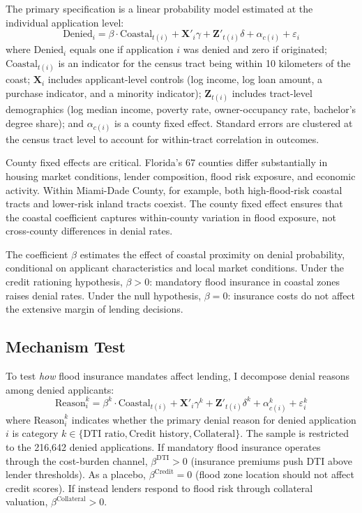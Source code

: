 \documentclass[12pt]{article}
\begin{document}
The primary specification is a linear probability model estimated at the individual application level:
\begin{equation}
\text{Denied}_{i} = \beta \cdot \text{Coastal}_{t(i)} + \mathbf{X}'_{i}\gamma + \mathbf{Z}'_{t(i)}\delta + \alpha_{c(i)} + \varepsilon_{i}
\label{eq:main}
\end{equation}
where $\text{Denied}_{i}$ equals one if application $i$ was denied and zero if originated; $\text{Coastal}_{t(i)}$ is an indicator for the census tract being within 10 kilometers of the coast; $\mathbf{X}_{i}$ includes applicant-level controls (log income, log loan amount, a purchase indicator, and a minority indicator); $\mathbf{Z}_{t(i)}$ includes tract-level demographics (log median income, poverty rate, owner-occupancy rate, bachelor's degree share); and $\alpha_{c(i)}$ is a county fixed effect. Standard errors are clustered at the census tract level to account for within-tract correlation in outcomes.

County fixed effects are critical. Florida's 67 counties differ substantially in housing market conditions, lender composition, flood risk exposure, and economic activity. Within Miami-Dade County, for example, both high-flood-risk coastal tracts and lower-risk inland tracts coexist. The county fixed effect ensures that the coastal coefficient captures within-county variation in flood exposure, not cross-county differences in denial rates.

The coefficient $\beta$ estimates the effect of coastal proximity on denial probability, conditional on applicant characteristics and local market conditions. Under the credit rationing hypothesis, $\beta > 0$: mandatory flood insurance in coastal zones raises denial rates. Under the null hypothesis, $\beta = 0$: insurance costs do not affect the extensive margin of lending decisions.

\subsection{Mechanism Test}

To test \textit{how} flood insurance mandates affect lending, I decompose denial reasons among denied applicants:
\begin{equation}
\text{Reason}^{k}_{i} = \beta^{k} \cdot \text{Coastal}_{t(i)} + \mathbf{X}'_{i}\gamma^{k} + \mathbf{Z}'_{t(i)}\delta^{k} + \alpha^{k}_{c(i)} + \varepsilon^{k}_{i}
\label{eq:mechanism}
\end{equation}
where $\text{Reason}^{k}_{i}$ indicates whether the primary denial reason for denied application $i$ is category $k \in \{\text{DTI ratio}, \text{Credit history}, \text{Collateral}\}$. The sample is restricted to the 216,642 denied applications. If mandatory flood insurance operates through the cost-burden channel, $\beta^{\text{DTI}} > 0$ (insurance premiums push DTI above lender thresholds). As a placebo, $\beta^{\text{Credit}} = 0$ (flood zone location should not affect credit scores). If instead lenders respond to flood risk through collateral valuation, $\beta^{\text{Collateral}} > 0$.
\end{document}
